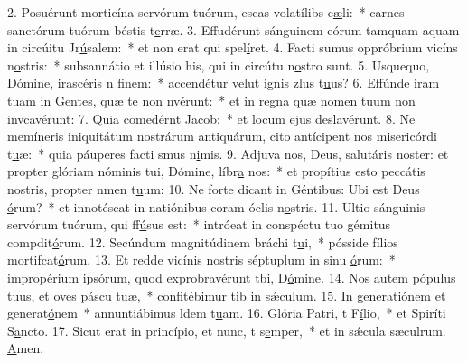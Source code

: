 2. Posuérunt morticína servórum tuórum, escas volatílibs c\uline{æ}li:~* carnes sanctórum tuórum béstis t\uline{e}rræ.
3. Effudérunt sánguinem eórum tamquam aquam in circúitu Jr\uline{ú}salem:~* et non erat qui spel\uline{í}ret.
4. Facti sumus oppróbrium vicíns n\uline{o}stris:~* subsannátio et illúsio his, qui in circútu n\uline{o}stro sunt.
5. Usquequo, Dómine, irascéris n f\uline{i}nem:~* accendétur velut ignis zlus t\uline{u}us?
6. Effúnde iram tuam in Gentes, quæ te non nv\uline{é}runt:~* et in regna quæ nomen tuum non invcav\uline{é}runt:
7. Quia comedérnt J\uline{a}cob:~* et locum ejus deslav\uline{é}runt.
8. Ne memíneris iniquitátum nostrárum antiquárum, cito antícipent nos misericórdi t\uline{u}æ:~* quia páuperes facti smus n\uline{i}mis.
9. Adjuva nos, Deus, salutáris noster: et propter glóriam nóminis tui, Dómine, líbr\uline{a} nos:~* et propítius esto peccátis nostris, propter nmen t\uline{u}um:
10. Ne forte dicant in Géntibus: Ubi est Deus \uline{ó}rum?~* et innotéscat in natiónibus coram óclis n\uline{o}stris.
11. Ultio sánguinis servórum tuórum, qui ff\uline{ú}sus est:~* intróeat in conspéctu tuo gémitus compdit\uline{ó}rum.
12. Secúndum magnitúdinem bráchi t\uline{u}i,~* pósside fílios mortifcat\uline{ó}rum.
13. Et redde vicínis nostris séptuplum in sinu \uline{ó}rum:~* impropérium ipsórum, quod exprobravérunt tbi, D\uline{ó}mine.
14. Nos autem pópulus tuus, et oves páscu t\uline{u}æ,~* confitébimur tib in s\uline{ǽ}culum.
15. In generatiónem et generat\uline{ó}nem~* annuntiábimus ldem t\uline{u}am.
16. Glória Patri, t F\uline{í}lio,~* et Spiríti S\uline{a}ncto.
17. Sicut erat in princípio, et nunc, t s\uline{e}mper,~* et in sǽcula sæculrum. \uline{A}men.
